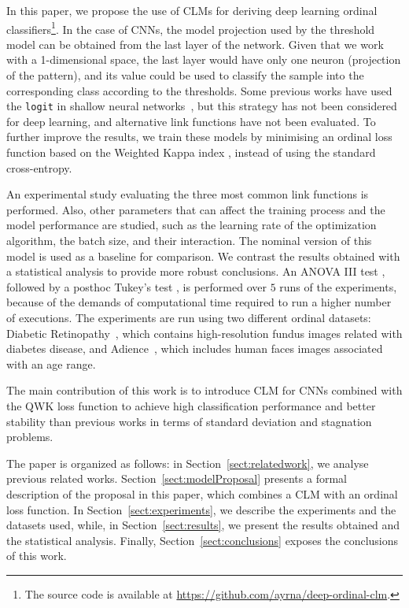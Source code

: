 \documentclass[preprint]{elsarticle}
\begin{document}
In this paper, we propose the use of CLMs for deriving deep learning ordinal classifiers\footnote{The source code is available at \url{https://github.com/ayrna/deep-ordinal-clm}.}. In the case of CNNs, the model projection used by the threshold model can be obtained from the last layer of the network. Given that we work with a 1-dimensional space, the last layer would have only one neuron (projection of the pattern), and its value could be used to classify the sample into the corresponding class according to the thresholds. Some previous works have used the \texttt{logit} in shallow neural networks~\cite{gutierrez2016ordinal}, but this strategy has not been considered for deep learning, and alternative link functions have not been evaluated. To further improve the results, we train these models by minimising an ordinal loss function based on the Weighted Kappa index \cite{de2018weighted}, instead of using the standard cross-entropy.

An experimental study evaluating the three most common link functions is performed. Also, other parameters that can affect the training process and the model performance are studied, such as the learning rate of the optimization algorithm, the batch size, and their interaction. The nominal version of this model is used as a baseline for comparison. We contrast the results obtained with a statistical analysis to provide more robust conclusions. An ANOVA III test \cite{miller1997beyond}, followed by a posthoc Tukey's test \cite{tukey1949comparing}, is performed over $5$ runs of the experiments, because of the demands of computational time required to run a higher number of executions. The experiments are run using two different ordinal datasets: Diabetic Retinopathy~\cite{de2018weighted}, which contains high-resolution fundus images related with diabetes disease, and Adience~\cite{beckham2017unimodal}, which includes human faces images associated with an age range.

The main contribution of this work is to introduce CLM for CNNs combined with the QWK loss function to achieve high classification performance and better stability than previous works in terms of standard deviation and stagnation problems.

The paper is organized as follows: in Section~\ref{sect:relatedwork}, we analyse previous related works. Section~\ref{sect:modelProposal} presents a formal description of the proposal in this paper, which combines a CLM with an ordinal loss function. In Section~\ref{sect:experiments}, we describe the experiments and the datasets used, while, in Section~\ref{sect:results}, we present the results obtained and the statistical analysis. Finally, Section~\ref{sect:conclusions} exposes the conclusions of this work.
\end{document}
